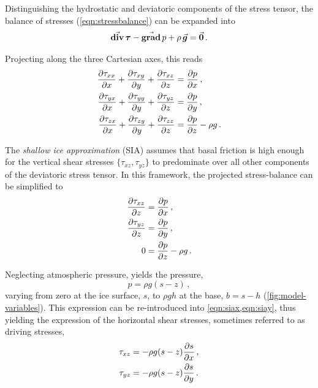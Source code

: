 \documentclass[a4paper]{kappa}
\newcommand{\vect}[1]{\va*{#1}} %
\newcommand{\tens}[1]{\vb*{#1}} %
\renewcommand{\grad}[1]{\vect{\mathrm{grad}}\,#1}   %
\newcommand{\tdiv}[1]{\vect{\mathrm{div}}\,#1}      %
\newcommand{\DST}[0]{\tens{\tau}}       %
\begin{document}
Distinguishing the hydrostatic and deviatoric components of the stress tensor,
the balance of stresses (\ref{eqn:stressbalance}) can be expanded into
\begin{equation}
    \tdiv{\DST} - \grad{p} + \rho\,\vect{g} = \vect{0} \,.
\end{equation}

Projecting along the three Cartesian axes, this reads
\begin{subequations}
\label{eqn:fullstokes}
\begin{align}
    \pdv{\tau_{xx}}{x} + \pdv{\tau_{xy}}{y} + \pdv{\tau_{xz}}{z}
        &= \pdv{p}{x} \,, \\
    \pdv{\tau_{yx}}{x} + \pdv{\tau_{yy}}{y} + \pdv{\tau_{yz}}{z}
        &= \pdv{p}{y} \,, \\
    \pdv{\tau_{zx}}{x} + \pdv{\tau_{zy}}{y} + \pdv{\tau_{zz}}{z}
        &= \pdv{p}{z} - \rho g \,.
\end{align}
\end{subequations}

The \emph{shallow ice approximation} (SIA) assumes that basal friction is high
enough
for the vertical shear stresses $\{\tau_{xz}, \tau_{yz}\}$ to predominate over
all other components of the deviatoric stress tensor. In this framework, the
projected stress-balance can be simplified to
\begin{subequations}
\label{eqn:sia}
\begin{align}
    \label{eqn:siax}
    \pdv{\tau_{xz}}{z} &= \pdv{p}{x} \,, \\
    \label{eqn:siay}
    \pdv{\tau_{yz}}{z} &= \pdv{p}{y} \,, \\
    \label{eqn:siaz}
    0 &= \pdv{p}{z} - \rho g \,.
\end{align}
\end{subequations}

Neglecting atmospheric pressure,  yields the pressure,
\begin{equation}
    p = \rho g (s-z) \,,
\end{equation}
varying from zero at the ice surface, $s$, to $\rho gh$ at the base, ${b=s-h}$
(\cref{fig:model-variables}). This expression
can be re-introduced into \cref{eqn:siax,eqn:siay}, thus yielding the
expression of the horizontal shear stresses, sometimes referred to as driving
stresses,
\begin{subequations}
\begin{align}
    \tau_{xz} &= -\rho g (s-z) \pdv{s}{x} \,, \\
    \tau_{yz} &= -\rho g (s-z) \pdv{s}{y} \,.
\end{align}
\end{subequations}
\end{document}

